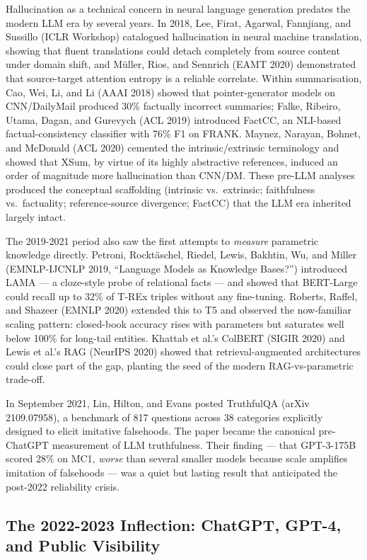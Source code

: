 Hallucination as a technical concern in neural language generation predates the modern LLM era by several years. In 2018, Lee, Firat, Agarwal, Fannjiang, and Sussillo (ICLR Workshop) catalogued hallucination in neural machine translation, showing that fluent translations could detach completely from source content under domain shift, and Müller, Rios, and Sennrich (EAMT 2020) demonstrated that source-target attention entropy is a reliable correlate. Within summarisation, Cao, Wei, Li, and Li (AAAI 2018) showed that pointer-generator models on CNN/DailyMail produced 30\% factually incorrect summaries; Falke, Ribeiro, Utama, Dagan, and Gurevych (ACL 2019) introduced FactCC, an NLI-based factual-consistency classifier with 76\% F1 on FRANK. Maynez, Narayan, Bohnet, and McDonald (ACL 2020) cemented the intrinsic/extrinsic terminology and showed that XSum, by virtue of its highly abstractive references, induced an order of magnitude more hallucination than CNN/DM. These pre-LLM analyses produced the conceptual scaffolding (intrinsic vs.~extrinsic; faithfulness vs.~factuality; reference-source divergence; FactCC) that the LLM era inherited largely intact.

The 2019-2021 period also saw the first attempts to \emph{measure} parametric knowledge directly. Petroni, Rocktäschel, Riedel, Lewis, Bakhtin, Wu, and Miller (EMNLP-IJCNLP 2019, ``Language Models as Knowledge Bases?'') introduced LAMA --- a cloze-style probe of relational facts --- and showed that BERT-Large could recall up to 32\% of T-REx triples without any fine-tuning. Roberts, Raffel, and Shazeer (EMNLP 2020) extended this to T5 and observed the now-familiar scaling pattern: closed-book accuracy rises with parameters but saturates well below 100\% for long-tail entities. Khattab et al.'s ColBERT (SIGIR 2020) and Lewis et al.'s RAG (NeurIPS 2020) showed that retrieval-augmented architectures could close part of the gap, planting the seed of the modern RAG-vs-parametric trade-off.

In September 2021, Lin, Hilton, and Evans posted TruthfulQA (arXiv 2109.07958), a benchmark of 817 questions across 38 categories explicitly designed to elicit imitative falsehoods. The paper became the canonical pre-ChatGPT measurement of LLM truthfulness. Their finding --- that GPT-3-175B scored 28\% on MC1, \emph{worse} than several smaller models because scale amplifies imitation of falsehoods --- was a quiet but lasting result that anticipated the post-2022 reliability crisis.

\subsection{The 2022-2023 Inflection: ChatGPT, GPT-4, and Public Visibility}\label{the-2022-2023-inflection-chatgpt-gpt-4-and-public-visibility}

